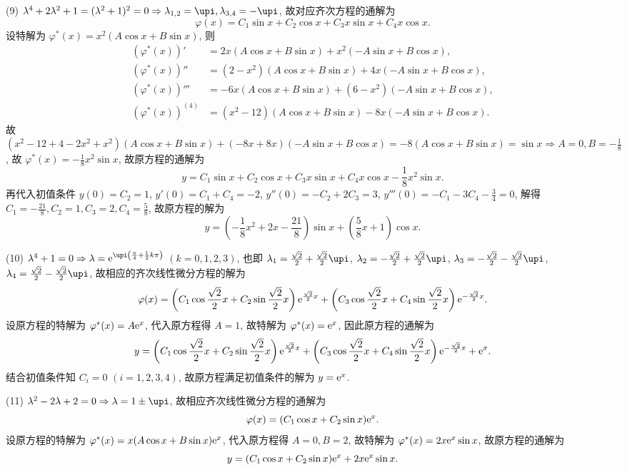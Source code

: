\begin{solution}
  (9) $\lambda^4+2\lambda^2+1=(\lambda^2+1)^2=0\Rightarrow\lambda_{1,2}=\upi,\lambda_{3,4}=-\upi$,
  故对应齐次方程的通解为
  \[\varphi(x)=C_1\sin x+C_2\cos x+C_3x\sin x+C_4x\cos x.\]
  设特解为 $\varphi^*(x)=x^2(A\cos x+B\sin x)$, 则
  \[\begin{split}
    \left(\varphi^*(x)\right)'&=2x(A\cos x+B\sin x)+x^2(-A\sin x+B\cos x), \\
    \left(\varphi^*(x)\right)''&=(2-x^2)(A\cos x+B\sin x)+4x(-A\sin x+B\cos x), \\
    \left(\varphi^*(x)\right)'''&=-6x(A\cos x+B\sin x)+(6-x^2)(-A\sin x+B\cos x), \\
    \left(\varphi^*(x)\right)^{(4)}&=(x^2-12)(A\cos x+B\sin x)-8x(-A\sin x+B\cos x).
  \end{split}\]
  故 $(x^2-12+4-2x^2+x^2)(A\cos x+B\sin x)+(-8x+8x)(-A\sin x+B\cos x)=-8(A\cos x+B\sin x)=\sin x\Rightarrow A=0,B=-\frac{1}{8}$, 
  故 $\varphi^*(x)=-\frac{1}{8}x^2\sin x$, 故原方程的通解为
  \[y=C_1\sin x+C_2\cos x+C_3x\sin x+C_4x\cos x-\frac{1}{8}x^2\sin x.\]
  再代入初值条件 $y(0)=C_2=1$, $y'(0)=C_1+C_4=-2$, $y''(0)=-C_2+2C_3=3$, 
  $y'''(0)=-C_1-3C_4-\frac{3}{4}=0$, 
  解得 $C_1=-\frac{21}{8},C_2=1,C_3=2,C_4=\frac{5}{8}$, 故原方程的解为
  \[y=\left(-\frac{1}{8}x^2+2x-\frac{21}{8}\right)\sin x+\left(\frac{5}{8}x+1\right)\cos x.\]

  (10) $\lambda^4+1=0\Rightarrow\lambda=\e^{\upi\left(\frac{\pi}{4}+\frac{1}{2}k\pi\right)}$ 
  $(k=0,1,2,3)$, 
  也即 
  $\lambda_1=\frac{\sqrt{2}}{2}+\frac{\sqrt{2}}{2}\upi$,
  $\lambda_2=-\frac{\sqrt{2}}{2}+\frac{\sqrt{2}}{2}\upi$,
  $\lambda_3=-\frac{\sqrt{2}}{2}-\frac{\sqrt{2}}{2}\upi$,
  $\lambda_4=\frac{\sqrt{2}}{2}-\frac{\sqrt{2}}{2}\upi$, 
  故相应的齐次线性微分方程的解为
  \[\varphi(x) = 
  \left(C_1\cos\frac{\sqrt{2}}{2}x+C_2\sin\frac{\sqrt{2}}{2}x\right)\mathrm{e}^{\frac{\sqrt{2}}{2}x}
  + \left(C_3\cos\frac{\sqrt{2}}{2}x+C_4\sin\frac{\sqrt{2}}{2}x\right)\mathrm{e}^{-\frac{\sqrt{2}}{2}x}.\]
  设原方程的特解为 $\varphi^*(x)=A\mathrm{e}^x$, 代入原方程得 $A=1$, 故特解为 $\varphi^*(x)=\mathrm{e}^x$, 因此原方程的通解为
  \[y = \left(C_1\cos\frac{\sqrt{2}}{2}x+C_2\sin\frac{\sqrt{2}}{2}x\right)\mathrm{e}^{\frac{\sqrt{2}}{2}x}
  + \left(C_3\cos\frac{\sqrt{2}}{2}x+C_4\sin\frac{\sqrt{2}}{2}x\right)\mathrm{e}^{-\frac{\sqrt{2}}{2}x}+\mathrm{e}^x.\]
  结合初值条件知 $C_i=0$ $(i=1,2,3,4)$, 故原方程满足初值条件的解为 $y=\mathrm{e}^x$.

  (11) $\lambda^2-2\lambda+2=0\Rightarrow\lambda=1\pm\upi$, 故相应齐次线性微分方程的通解为
  \[\varphi(x)=(C_1\cos x+C_2\sin x)\mathrm{e}^x.\]
  设原方程的特解为 $\varphi^*(x)=x(A\cos x+B\sin x)\mathrm{e}^x$, 代入原方程得 $A=0,B=2$, 
  故特解为 $\varphi^*(x)=2x\mathrm{e}^x\sin x$, 故原方程的通解为
  \[y=(C_1\cos x+C_2\sin x)\mathrm{e}^x+2x\mathrm{e}^x\sin x.\]


\end{solution}
